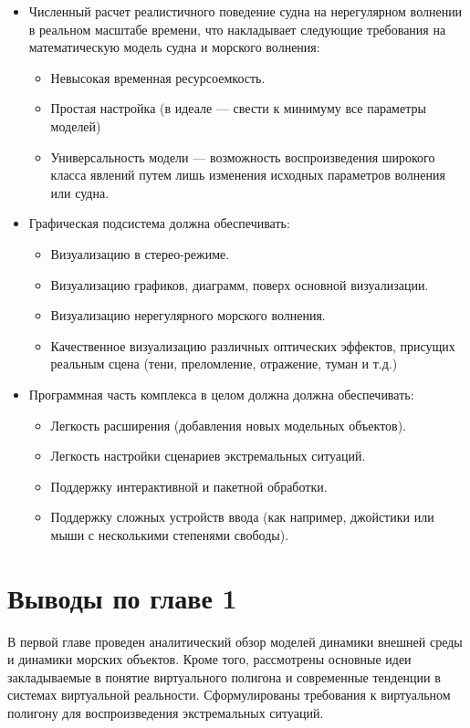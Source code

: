 \begin{itemize}

	\item	Численный расчет реалистичного поведение судна на нерегулярном волнении 
			в реальном масштабе времени, 
			что накладывает следующие требования на математическую модель судна и морского волнения:
			\begin{itemize}
				\item	Невысокая временная ресурсоемкость.
				\item	Простая настройка (в идеале --- свести к минимуму все 
						 параметры моделей)
				\item	Универсальность модели --- возможность воспроизведения 
						широкого класса явлений путем лишь изменения исходных 
						параметров волнения или судна.
			\end{itemize}
	
	\item	Графическая подсистема должна обеспечивать:
			\begin{itemize}
				\item	Визуализацию в стерео-режиме.
				\item	Визуализацию графиков, диаграмм, поверх основной визуализации.
				\item	Визуализацию нерегулярного морского волнения.
				\item	Качественное визуализацию различных оптических эффектов, присущих 
						реальным сцена (тени, преломление, отражение, туман и т.д.)
			\end{itemize}
			
	\item	Программная часть комплекса в целом должна должна обеспечивать:
			\begin{itemize}
				\item 	Легкость расширения (добавления новых модельных объектов).
				\item 	Легкость настройки сценариев экстремальных ситуаций.
				\item 	Поддержку интерактивной и пакетной обработки.
				\item	Поддержку сложных устройств ввода 
						(как например, джойстики или  мыши с 
						несколькими степенями свободы).
			\end{itemize}
\end{itemize}



\section{Выводы по главе 1}

В первой главе проведен аналитический обзор моделей динамики внешней среды и динамики морских объектов. 
Кроме того, рассмотрены основные идеи закладываемые в понятие виртуального полигона и современные тенденции в системах виртуальной реальности.
Сформулированы требования к виртуальном полигону для воспроизведения экстремальных ситуаций.









